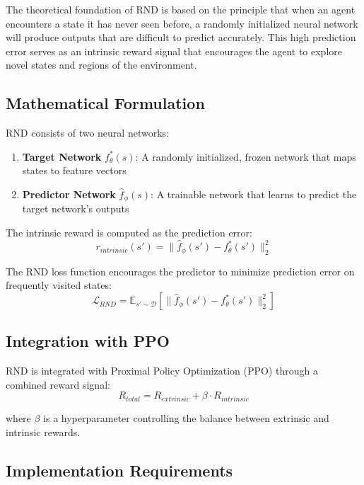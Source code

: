 \documentclass[12pt]{article}
\begin{document}
{{{The theoretical foundation of RND is based on the principle that when an agent encounters a state it has never seen before, a randomly initialized neural network will produce outputs that are difficult to predict accurately. This high prediction error serves as an intrinsic reward signal that encourages the agent to explore novel states and regions of the environment.

\subsection{Mathematical Formulation}

RND consists of two neural networks:
\begin{enumerate}
    \item \textbf{Target Network} $f^*_\theta(s)$: A randomly initialized, frozen network that maps states to feature vectors
    \item \textbf{Predictor Network} $\hat{f}_\phi(s)$: A trainable network that learns to predict the target network's outputs
\end{enumerate}

The intrinsic reward is computed as the prediction error:
\begin{equation}
r_{intrinsic}(s') = \|\hat{f}_\phi(s') - f^*_\theta(s')\|_2^2
\end{equation}

The RND loss function encourages the predictor to minimize prediction error on frequently visited states:
\begin{equation}
\mathcal{L}_{RND} = \mathbb{E}_{s' \sim \mathcal{D}} \left[ \|\hat{f}_\phi(s') - f^*_\theta(s')\|_2^2 \right]
\end{equation}

\subsection{Integration with PPO}

RND is integrated with Proximal Policy Optimization (PPO) through a combined reward signal:
\begin{equation}
R_{total} = R_{extrinsic} + \beta \cdot R_{intrinsic}
\end{equation}

where $\beta$ is a hyperparameter controlling the balance between extrinsic and intrinsic rewards.

\subsection{Implementation Requirements}

}}}
\end{document}
